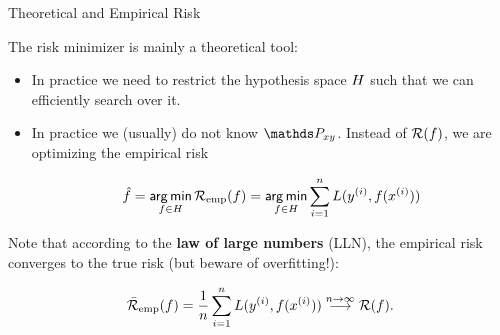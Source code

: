 \begin{vbframe}{Theoretical and Empirical Risk}  
 

The risk minimizer is mainly a theoretical tool: 

\begin{itemize}
	\item In practice we need to restrict the hypothesis space $H$ such that we can efficiently search over it. 
	\item In practice we (usually) do not know $\Pxy$. Instead of $\mathcal{R}(f)$, we are optimizing the empirical risk

	\begin{eqnarray*}
		\hat f = \mathop{\sf arg\,min}_{f \in H} \mathcal{R}_{\text{emp}}(f) = \mathop{\sf arg\,min}_{f \in H} \sum_{i=1}^n L(y^{(i)}, f(x^{(i)}))
	\end{eqnarray*}

\end{itemize}

Note that according to the \textbf{law of large numbers} (LLN), the empirical risk converges to the true risk (but beware of overfitting!): 

\begin{eqnarray*}
	\bar{\mathcal{R}}_\text{emp}(f) = \frac{1}{n} \sum_{i=1}^n L(y^{(i)}, f(x^{(i)})) \overset{n \to \infty}{\longrightarrow} \mathcal{R}(f). 
\end{eqnarray*}

\end{vbframe}



